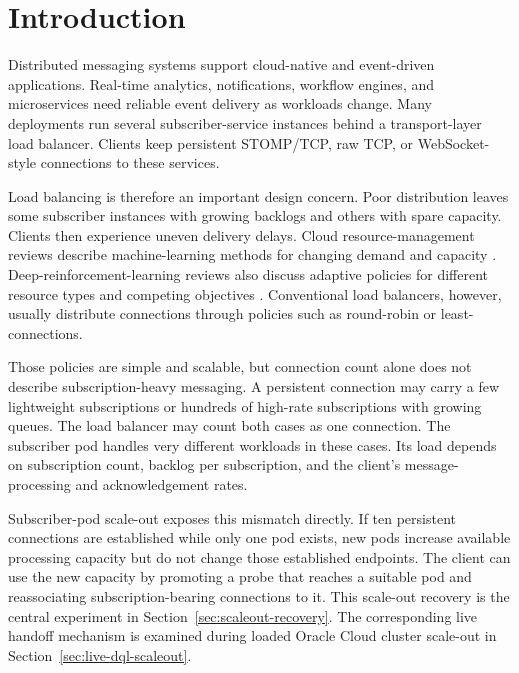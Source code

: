 \documentclass[manuscript,nonacm]{acmart}
\begin{document}

\maketitle
\raggedbottom

\section{Introduction}

Distributed messaging systems support cloud-native and event-driven applications. Real-time analytics, notifications, workflow engines, and microservices need reliable event delivery as workloads change. Many deployments run several subscriber-service instances behind a transport-layer load balancer. Clients keep persistent STOMP/TCP, raw TCP, or WebSocket-style connections to these services.

Load balancing is therefore an important design concern. Poor distribution leaves some subscriber instances with growing backlogs and others with spare capacity. Clients then experience uneven delivery delays. Cloud resource-management reviews describe machine-learning methods for changing demand and capacity \cite{Khan2022MLCloudReview}. Deep-reinforcement-learning reviews also discuss adaptive policies for different resource types and competing objectives \cite{Zhou2024DRLCloudReview}. Conventional load balancers, however, usually distribute connections through policies such as round-robin or least-connections.

Those policies are simple and scalable, but connection count alone does not describe subscription-heavy messaging. A persistent connection may carry a few lightweight subscriptions or hundreds of high-rate subscriptions with growing queues. The load balancer may count both cases as one connection. The subscriber pod handles very different workloads in these cases. Its load depends on subscription count, backlog per subscription, and the client's message-processing and acknowledgement rates.

Subscriber-pod scale-out exposes this mismatch directly. If ten persistent
connections are established while only one pod exists, new pods increase
available processing capacity but do not change those established endpoints.
The client can use the new capacity by promoting a probe that reaches a
suitable pod and reassociating subscription-bearing connections to it. This
scale-out recovery is the central experiment in Section~\ref{sec:scaleout-recovery}.
The corresponding live handoff mechanism is examined during loaded Oracle
Cloud cluster scale-out in Section~\ref{sec:live-dql-scaleout}.
\end{document}
